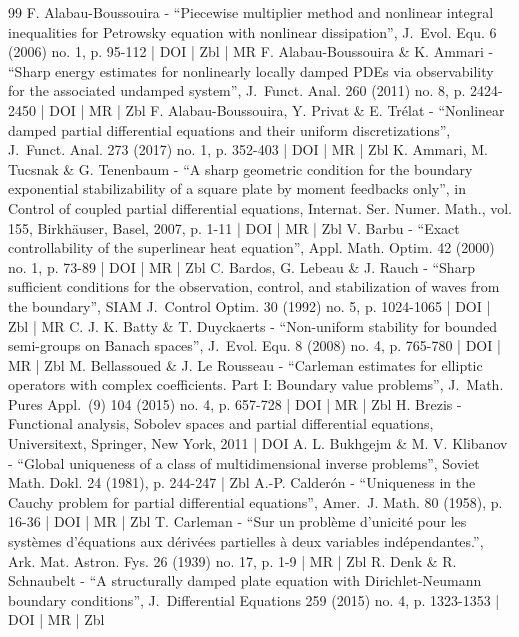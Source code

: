 \begin{thebibliography}{99}
F. Alabau-Boussouira - “Piecewise multiplier method and nonlinear integral inequalities for Petrowsky equation with nonlinear dissipation”, J. Evol. Equ. 6 (2006) no. 1, p. 95-112 | DOI | Zbl | MR
F. Alabau-Boussouira \& K. Ammari - “Sharp energy estimates for nonlinearly locally damped PDEs via observability for the associated undamped system”, J. Funct. Anal. 260 (2011) no. 8, p. 2424-2450 | DOI | MR | Zbl
F. Alabau-Boussouira, Y. Privat \& E. Trélat - “Nonlinear damped partial differential equations and their uniform discretizations”, J. Funct. Anal. 273 (2017) no. 1, p. 352-403 | DOI | MR | Zbl
K. Ammari, M. Tucsnak \& G. Tenenbaum - “A sharp geometric condition for the boundary exponential stabilizability of a square plate by moment feedbacks only”, in Control of coupled partial differential equations, Internat. Ser. Numer. Math., vol. 155, Birkhäuser, Basel, 2007, p. 1-11 | DOI | MR | Zbl
V. Barbu - “Exact controllability of the superlinear heat equation”, Appl. Math. Optim. 42 (2000) no. 1, p. 73-89 | DOI | MR | Zbl
C. Bardos, G. Lebeau \& J. Rauch - “Sharp sufficient conditions for the observation, control, and stabilization of waves from the boundary”, SIAM J. Control Optim. 30 (1992) no. 5, p. 1024-1065 | DOI | Zbl | MR
C. J. K. Batty \& T. Duyckaerts - “Non-uniform stability for bounded semi-groups on Banach spaces”, J. Evol. Equ. 8 (2008) no. 4, p. 765-780 | DOI | MR | Zbl
M. Bellassoued \& J. Le Rousseau - “Carleman estimates for elliptic operators with complex coefficients. Part I: Boundary value problems”, J. Math. Pures Appl. (9) 104 (2015) no. 4, p. 657-728 | DOI | MR | Zbl
H. Brezis - Functional analysis, Sobolev spaces and partial differential equations, Universitext, Springer, New York, 2011 | DOI
A. L. Bukhgejm \& M. V. Klibanov - “Global uniqueness of a class of multidimensional inverse problems”, Soviet Math. Dokl. 24 (1981), p. 244-247 | Zbl
A.-P. Calderón - “Uniqueness in the Cauchy problem for partial differential equations”, Amer. J. Math. 80 (1958), p. 16-36 | DOI | MR | Zbl
T. Carleman - “Sur un problème d’unicité pour les systèmes d’équations aux dérivées partielles à deux variables indépendantes.”, Ark. Mat. Astron. Fys. 26 (1939) no. 17, p. 1-9 | MR | Zbl
R. Denk \& R. Schnaubelt - “A structurally damped plate equation with Dirichlet-Neumann boundary conditions”, J. Differential Equations 259 (2015) no. 4, p. 1323-1353 | DOI | MR | Zbl

\end{thebibliography}
